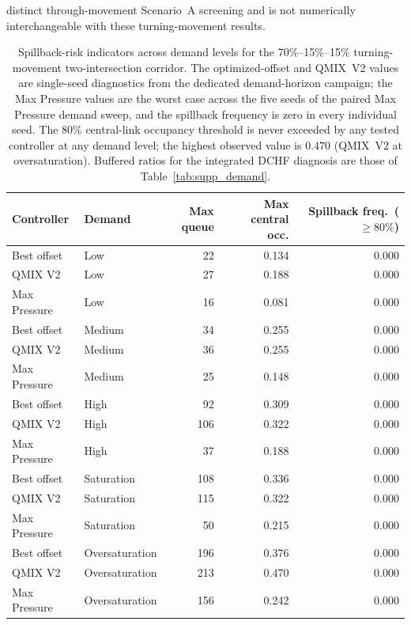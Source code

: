 \documentclass[12pt]{article}
\begin{document}
distinct through-movement Scenario~A screening and is not numerically
interchangeable with these turning-movement results.
\begin{table}[H]
\centering
\caption{Spillback-risk indicators across demand levels for the
70\%--15\%--15\% turning-movement two-intersection corridor. The
optimized-offset and QMIX~V2 values are single-seed diagnostics from the
dedicated demand-horizon campaign; the Max Pressure values are the worst
case across the five seeds of the paired Max Pressure demand sweep, and
the spillback frequency is zero in every individual seed. The $80\%$
central-link occupancy threshold is never exceeded by any tested
controller at any demand level; the highest observed value is $0.470$
(QMIX~V2 at oversaturation). Buffered ratios for the integrated DCHF
diagnosis are those of Table~\ref{tab:supp_demand}.}
\label{tab:supp_capacity}
\small
\begin{tabular}{llrrr}
\toprule
\textbf{Controller} & \textbf{Demand} & \textbf{Max queue} &
\textbf{Max central occ.} & \textbf{Spillback freq.\ ($\geq80\%$)} \\
\midrule
Best offset  & Low            &  22 & 0.134 & 0.000 \\
QMIX V2      & Low            &  27 & 0.188 & 0.000 \\
Max Pressure & Low            &  16 & 0.081 & 0.000 \\
\midrule
Best offset  & Medium         &  34 & 0.255 & 0.000 \\
QMIX V2      & Medium         &  36 & 0.255 & 0.000 \\
Max Pressure & Medium         &  25 & 0.148 & 0.000 \\
\midrule
Best offset  & High           &  92 & 0.309 & 0.000 \\
QMIX V2      & High           & 106 & 0.322 & 0.000 \\
Max Pressure & High           &  37 & 0.188 & 0.000 \\
\midrule
Best offset  & Saturation     & 108 & 0.336 & 0.000 \\
QMIX V2      & Saturation     & 115 & 0.322 & 0.000 \\
Max Pressure & Saturation     &  50 & 0.215 & 0.000 \\
\midrule
Best offset  & Oversaturation & 196 & 0.376 & 0.000 \\
QMIX V2      & Oversaturation & 213 & 0.470 & 0.000 \\
Max Pressure & Oversaturation & 156 & 0.242 & 0.000 \\
\bottomrule
\end{tabular}
\end{table}
\end{document}
